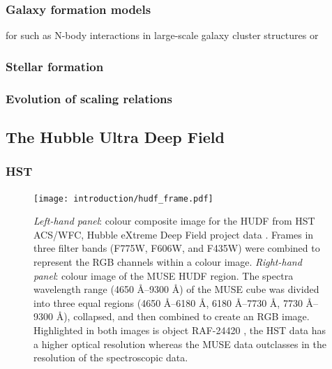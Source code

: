 \documentclass[12pt, twocolumn]{revtex4-1}    %
\begin{document}
\subsubsection{Galaxy formation models}

for such as N-body interactions in large-scale galaxy cluster structures or 


\subsubsection{Stellar formation}


\subsubsection{Evolution of scaling relations}


\subsection{The Hubble Ultra Deep Field}

\subsubsection{HST}


\begin{figure}
\texttt{[image: introduction/hudf\_frame.pdf]}
\captionsetup{justification=justified, format=plain}
\caption[Hubble Ultra Deep Field]{\textit{Left-hand panel}: colour composite image for the HUDF from HST ACS/WFC, Hubble eXtreme Deep Field project data \citep{2013ApJS..209....6I}. Frames in three filter bands (F775W, F606W, and F435W) were combined to represent the RGB channels within a colour image. \textit{Right-hand panel}: colour image of the MUSE HUDF region. The spectra wavelength range (4650 \AA--9300 \AA) of the MUSE cube was divided into three equal regions (4650 \AA--6180 \AA, 6180 \AA--7730 \AA, 7730 \AA -- 9300 \AA), collapsed, and then combined to create an RGB image. Highlighted in both images is object RAF-24420 \citep{2015AJ....150...31R}, the HST data has a higher optical resolution whereas the MUSE data outclasses in the resolution of the spectroscopic data.}
\label{fig:hst_muse_hdf}
\end{figure}
\end{document}
